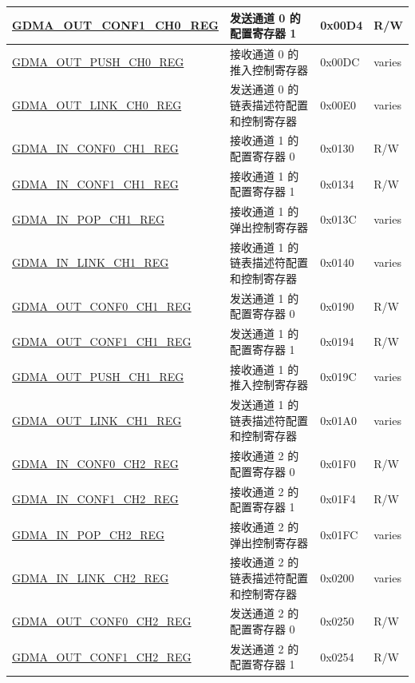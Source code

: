 \begin{longtable}{ | p{6cm} | p{7.2cm} | p{1.3cm} | p{1cm} | }
\hyperref[regdesc:GDMAOUTCONF1CHNREG]{GDMA\_OUT\_CONF1\_CH0\_REG} & 发送通道 0 的配置寄存器 1 & 0x00D4 & R/W \\ \hline
\hyperref[regdesc:GDMAOUTPUSHCHNREG]{GDMA\_OUT\_PUSH\_CH0\_REG} & 接收通道 0 的推入控制寄存器 & 0x00DC & varies \\ \hline
\hyperref[regdesc:GDMAOUTLINKCHNREG]{GDMA\_OUT\_LINK\_CH0\_REG} & 发送通道 0 的链表描述符配置和控制寄存器 & 0x00E0 & varies \\ \hline
\hyperref[regdesc:GDMAINCONF0CHNREG]{GDMA\_IN\_CONF0\_CH1\_REG} & 接收通道 1 的配置寄存器 0 & 0x0130 & R/W \\ \hline
\hyperref[regdesc:GDMAINCONF1CHNREG]{GDMA\_IN\_CONF1\_CH1\_REG} & 接收通道 1 的配置寄存器 1 & 0x0134 & R/W \\ \hline
\hyperref[regdesc:GDMAINPOPCHNREG]{GDMA\_IN\_POP\_CH1\_REG} & 接收通道 1 的弹出控制寄存器 & 0x013C & varies \\ \hline
\hyperref[regdesc:GDMAINLINKCHNREG]{GDMA\_IN\_LINK\_CH1\_REG} & 接收通道 1 的链表描述符配置和控制寄存器 & 0x0140 & varies \\ \hline
\hyperref[regdesc:GDMAOUTCONF0CHNREG]{GDMA\_OUT\_CONF0\_CH1\_REG} & 发送通道 1 的配置寄存器 0 & 0x0190 & R/W \\ \hline
\hyperref[regdesc:GDMAOUTCONF1CHNREG]{GDMA\_OUT\_CONF1\_CH1\_REG} & 发送通道 1  的配置寄存器 1 & 0x0194 & R/W \\ \hline
\hyperref[regdesc:GDMAOUTPUSHCHNREG]{GDMA\_OUT\_PUSH\_CH1\_REG} & 接收通道 1 的推入控制寄存器 & 0x019C & varies \\ \hline
\hyperref[regdesc:GDMAOUTLINKCHNREG]{GDMA\_OUT\_LINK\_CH1\_REG} & 发送通道 1 的链表描述符配置和控制寄存器 & 0x01A0 & varies \\ \hline
\hyperref[regdesc:GDMAINCONF0CHNREG]{GDMA\_IN\_CONF0\_CH2\_REG} & 接收通道 2 的配置寄存器 0 & 0x01F0 & R/W \\ \hline
\hyperref[regdesc:GDMAINCONF1CHNREG]{GDMA\_IN\_CONF1\_CH2\_REG} & 接收通道 2  的配置寄存器 1 & 0x01F4 & R/W \\ \hline
\hyperref[regdesc:GDMAINPOPCHNREG]{GDMA\_IN\_POP\_CH2\_REG} & 接收通道 2 的弹出控制寄存器 & 0x01FC & varies \\ \hline
\hyperref[regdesc:GDMAINLINKCHNREG]{GDMA\_IN\_LINK\_CH2\_REG} & 接收通道 2 的链表描述符配置和控制寄存器 & 0x0200 & varies \\ \hline
\hyperref[regdesc:GDMAOUTCONF0CHNREG]{GDMA\_OUT\_CONF0\_CH2\_REG} & 发送通道 2 的配置寄存器 0 & 0x0250 & R/W \\ \hline
\hyperref[regdesc:GDMAOUTCONF1CHNREG]{GDMA\_OUT\_CONF1\_CH2\_REG} & 发送通道 2  的配置寄存器 1 & 0x0254 & R/W \\ \hline

\end{longtable}
